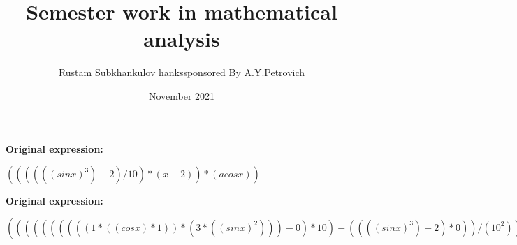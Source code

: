 \documentclass[a4paper, 12pt] {article}
\title{Semester work in mathematical analysis}
\author{Rustam Subkhankulov 	hanks{sponsored By A.Y.Petrovich}}
\date{November 2021}
\begin{document}
 
\maketitle


 \textbf{Original expression:}

\begin{math}
((((((sinx)^3)-2)/10)*(x-2))*(acosx))\end{math}



 \textbf{Original expression:}

\begin{math}
((((((((((1*((cosx)*1))*(3*((sinx)^2)))-0)*10)-((((sinx)^3)-2)*0))/(10^2))*(x-2))+(((((sinx)^3)-2)/10)*(1-0)))*(acosx))+((((((sinx)^3)-2)/10)*(x-2))*(1*(-1/((1-(x^2))^0.5)))))\end{math}
\end{document}
